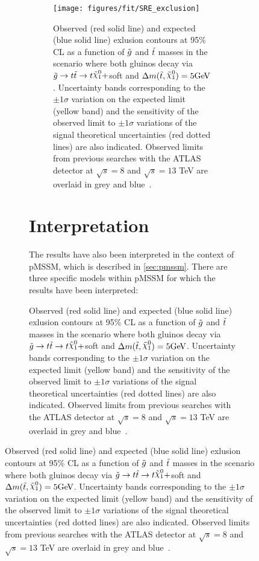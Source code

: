 \begin{figure}[htbp]
\begin{center}
\begin{figure}[htbp]
\begin{center}
{{{\begin{figure}[htpb]
  \begin{center}
    \texttt{[image: figures/fit/SRE\_exclusion]}
    \caption{Observed (red solid line) and expected (blue solid line)
      exlusion contours at 95\% CL as a function
      of $\tilde{g}$ and $\tilde{t}$ masses in the scenario where both
      gluinos decay via $\gluino\to t\stop\to t\ninoone+$soft
      and $\Delta m(\stop,\ninoone)=5\GeV$. Uncertainty bands corresponding to the $\pm 1
      \sigma$ variation on the expected limit (yellow band) and the
      sensitivity of the observed limit to $\pm 1\sigma$ variations of
      the signal theoretical uncertainties (red dotted lines) are also
      indicated. Observed limits from previous searches with the ATLAS detector at $\sqrt{s}=8$ and $\sqrt{s}=13$ TeV are overlaid in grey and blue~\cite{GtcStop1L,Gtc1L,GtcMonojet}.}
    \label{fig:SRE_exclusion}
  \end{center}
\end{figure}


%




\section{Interpretation}

The results have also been interpreted in the context of pMSSM, which is described in \ref{sec:pmssm}.  There are three specific models within pMSSM for which the results have been interpreted:

}}}
\end{center}
\end{figure}
\end{center}
\end{figure}
